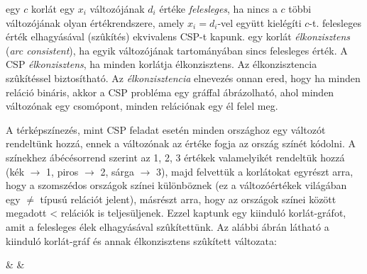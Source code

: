  egy $c$ korlát egy $x_i$ változójának $d_i$ értéke
  \emph{felesleges}, ha nincs a $c$ többi változójának olyan értékrendszere,
  amely $x_i=d_i$-vel együtt kielégíti $c$-t.
\br
\tetel felesleges érték elhagyásával (szûkítés) ekvivalens CSP-t kapunk.
\br
{} egy korlát \emph{élkonzisztens} (\emph{arc consistent}),
  ha egyik változójának tartományában sincs felesleges érték. A CSP
  \emph{élkonzisztens}, ha minden korlátja élkonzisztens. Az élkonzisztencia 
  szûkítéssel biztosítható.
\br
Az \emph{élkonzisztencia} elnevezés onnan ered, hogy ha minden reláció
bináris, akkor a CSP probléma egy gráffal ábrázolható, ahol minden változónak
egy csomópont, minden relációnak egy él felel meg.


A térképszínezés, mint CSP feladat esetén minden országhoz egy változót
rendeltünk hozzá, ennek a változónak az értéke fogja az ország színét
kódolni. A színekhez ábécésorrend szerint az 1, 2, 3 értékek valamelyikét
rendeltük hozzá (kék $\to$ 1, piros $\to$ 2, sárga $\to$ 3), majd felvettük a
korlátokat egyrészt arra, hogy a szomszédos országok színei különböznek (ez a
változóértékek világában egy $\neq$ típusú relációt jelent), másrészt arra, hogy
az országok színei között megadott < relációk is teljesüljenek. Ezzel
kaptunk egy kiinduló korlát-gráfot, amit a felesleges élek elhagyásával
szûkítettünk. Az alábbi ábrán látható a kiinduló korlát-gráf és annak
élkonzisztens szûkített változata:

 & &
\etab

